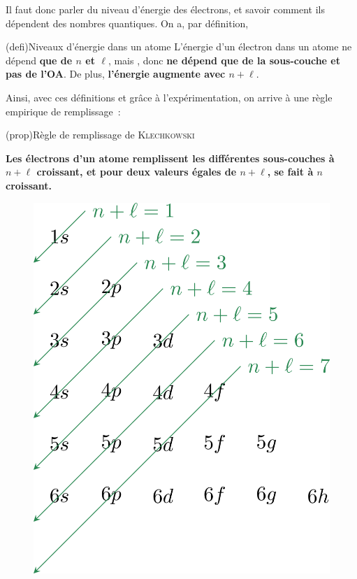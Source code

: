 \documentclass[../../main/main.tex]{subfiles}
\begin{document}
Il faut donc parler du niveau d'énergie des électrons, et savoir comment ils
dépendent des nombres quantiques. On a, par définition,

\begin{tcb*}(defi){Niveaux d'énergie dans un atome}
	L'énergie d'un électron dans un atome ne dépend \textbf{que de $n$ et
		$\ell$}, mais , donc \textbf{ne dépend que
		de la sous-couche et pas de l'OA}. \bigbreak
	De plus, \textbf{l'énergie augmente avec $n+\ell$}.
\end{tcb*}

Ainsi, avec ces définitions et grâce à l'expérimentation, on arrive à une règle
empirique de remplissage~:

\begin{tcb*}(prop){Règle de remplissage de \textsc{Klechkowski}}
	\begin{center}
		\bfseries
		Les électrons d'un atome remplissent les différentes sous-couches à
		$n+\ell$ croissant, et pour deux valeurs égales de $n+\ell$, se fait à
		$n$ croissant.
	\end{center}
	\begin{minipage}{0.45\linewidth}
		\begin{figure}[H]
			\centering
			\includegraphics[scale=1]{klechkowski}

\end{figure}
\end{minipage}
\end{tcb*}
\end{document}
